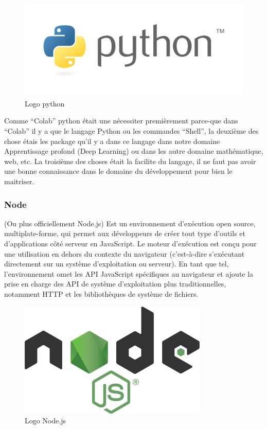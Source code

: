 \documentclass[12pt]{article}
\begin{document}
\begin{figure}[h]
	\centering
	\includegraphics[width=12cm]{img-Chapiter-4/Python_logo.png}
	\caption{Logo python}
\end{figure}

Comme “Colab” python était une nécessiter premièrement parce-que dans “Colab” il y a que le langage Python ou les commandes “Shell”, la deuxième des chose étais les package qu’il y a dans ce langage dans notre domaine Apprentissage profond (Deep Learning) ou dans les autre domaine mathématique, web, etc. La troisième des choses était la facilite du langage, il ne faut pas avoir une bonne connaissance dans le domaine du développement pour bien le maitriser.

\subsubsection*{Node}
(Ou plus officiellement Node.js) Est un environnement d'exécution open source, multiplate-forme, qui permet aux développeurs de créer tout type d'outils et d'applications côté serveur en JavaScript. Le moteur d’exécution est conçu pour une utilisation en dehors du contexte du navigateur (c’est-à-dire s’exécutant directement sur un système d’exploitation ou serveur). En tant que tel, l'environnement omet les API JavaScript spécifiques au navigateur et ajoute la prise en charge des API de système d'exploitation plus traditionnelles, notamment HTTP et les bibliothèques de système de fichiers.

\begin{figure}[h]
	\centering
	\includegraphics[width=9cm]{img-Chapiter-4/nodejs.png}
	\caption{Logo Node.js}
\end{figure}
\end{document}

